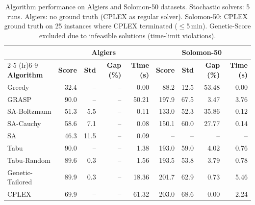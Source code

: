 \begin{table}[htbp]
\centering
\caption{Algorithm performance on Algiers and Solomon-50 datasets. Stochastic solvers: 5 runs. Algiers: no ground truth (CPLEX as regular solver). Solomon-50: CPLEX ground truth on 25 instances where CPLEX terminated ($\leq$5\,min). Genetic-Score excluded due to infeasible solutions (time-limit violations).}
\label{tab:results_algiers_s50}
\footnotesize
\setlength{\tabcolsep}{3.5pt}
\begin{tabular}{l rrrr rrrr}
\toprule
& \multicolumn{4}{c}{\textbf{Algiers}}
& \multicolumn{4}{c}{\textbf{Solomon-50}} \\
\cmidrule(lr){2-5} \cmidrule(lr){6-9}
\textbf{Algorithm}
& \textbf{Score} & \textbf{Std} & \textbf{Gap (\%)} & \textbf{Time (s)}
& \textbf{Score} & \textbf{Std} & \textbf{Gap (\%)} & \textbf{Time (s)} \\
\midrule
  Greedy & 32.4 & -- & -- & 0.00 & 88.2 & 12.5 & 53.48 & 0.00 \\
  GRASP & 90.0 & -- & -- & 50.21 & 197.9 & 67.5 & 3.47 & 3.76 \\
  SA-Boltzmann & 51.3 & 5.5 & -- & 0.11 & 133.0 & 52.3 & 35.86 & 0.12 \\
  SA-Cauchy & 58.6 & 7.1 & -- & 0.08 & 150.1 & 60.0 & 27.77 & 0.14 \\
  SA & 46.3 & 11.5 & -- & 0.09 & -- & -- & -- & -- \\
  Tabu & 90.0 & -- & -- & 1.38 & 193.0 & 59.0 & 4.02 & 0.76 \\
  Tabu-Random & 89.6 & 0.3 & -- & 1.56 & 193.5 & 53.8 & 3.79 & 0.78 \\
  Genetic-Tailored & 89.9 & 0.3 & -- & 18.36 & 201.7 & 62.9 & 0.73 & 5.46 \\
  CPLEX & 69.9 & -- & -- & 61.32 & 203.0 & 68.6 & 0.00 & 2.24 \\
\bottomrule
\end{tabular}
\end{table}